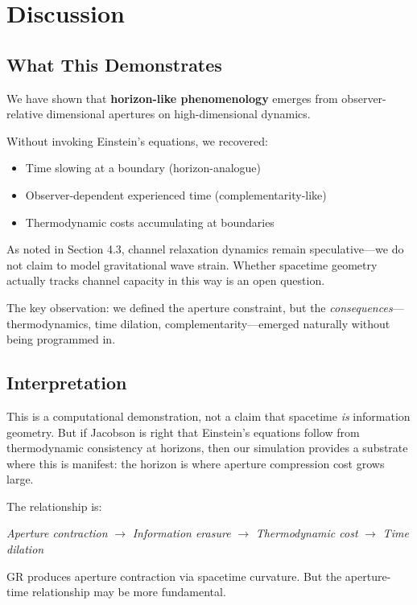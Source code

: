 \documentclass[11pt,a4paper]{article}
\begin{document}
\section{Discussion}

\subsection{What This Demonstrates}

We have shown that \textbf{horizon-like phenomenology} emerges from observer-relative dimensional apertures on high-dimensional dynamics.

Without invoking Einstein's equations, we recovered:
\begin{itemize}
    \item Time slowing at a boundary (horizon-analogue)
    \item Observer-dependent experienced time (complementarity-like)
    \item Thermodynamic costs accumulating at boundaries
\end{itemize}

\noindent As noted in Section 4.3, channel relaxation dynamics remain speculative---we do not claim to model gravitational wave strain. Whether spacetime geometry actually tracks channel capacity in this way is an open question.

The key observation: we defined the aperture constraint, but the \emph{consequences}---thermodynamics, time dilation, complementarity---emerged naturally without being programmed in.

\subsection{Interpretation}

This is a computational demonstration, not a claim that spacetime \emph{is} information geometry. But if Jacobson \cite{jacobson1995} is right that Einstein's equations follow from thermodynamic consistency at horizons, then our simulation provides a substrate where this is manifest: the horizon is where aperture compression cost grows large.

The relationship is:
\begin{center}
\emph{Aperture contraction} $\to$ \emph{Information erasure} $\to$ \emph{Thermodynamic cost} $\to$ \emph{Time dilation}
\end{center}

GR produces aperture contraction via spacetime curvature. But the aperture-time relationship may be more fundamental.
\end{document}
